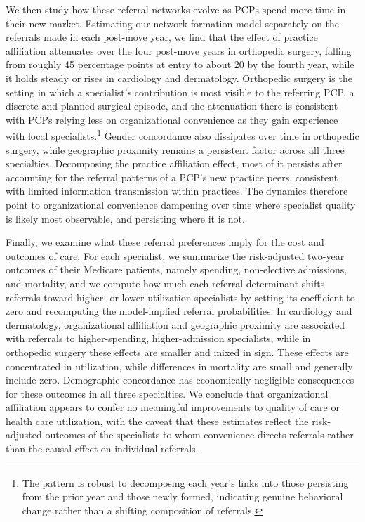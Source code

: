 \documentclass[12pt]{article}
\begin{document}
We then study how these referral networks evolve as PCPs spend more time in their new market. Estimating our network formation model separately on the referrals made in each post-move year, we find that the effect of practice affiliation attenuates over the four post-move years in orthopedic surgery, falling from roughly 45 percentage points at entry to about 20 by the fourth year, while it holds steady or rises in cardiology and dermatology. Orthopedic surgery is the setting in which a specialist's contribution is most visible to the referring PCP, a discrete and planned surgical episode, and the attenuation there is consistent with PCPs relying less on organizational convenience as they gain experience with local specialists.\footnote{The pattern is robust to decomposing each year's links into those persisting from the prior year and those newly formed, indicating genuine behavioral change rather than a shifting composition of referrals.} Gender concordance also dissipates over time in orthopedic surgery, while geographic proximity remains a persistent factor across all three specialties. Decomposing the practice affiliation effect, most of it persists after accounting for the referral patterns of a PCP's new practice peers, consistent with limited information transmission within practices. The dynamics therefore point to organizational convenience dampening over time where specialist quality is likely most observable, and persisting where it is not.

Finally, we examine what these referral preferences imply for the cost and outcomes of care. For each specialist, we summarize the risk-adjusted two-year outcomes of their Medicare patients, namely spending, non-elective admissions, and mortality, and we compute how much each referral determinant shifts referrals toward higher- or lower-utilization specialists by setting its coefficient to zero and recomputing the model-implied referral probabilities. In cardiology and dermatology, organizational affiliation and geographic proximity are associated with referrals to higher-spending, higher-admission specialists, while in orthopedic surgery these effects are smaller and mixed in sign. These effects are concentrated in utilization, while differences in mortality are small and generally include zero. Demographic concordance has economically negligible consequences for these outcomes in all three specialties. We conclude that organizational affiliation appears to confer no meaningful improvements to quality of care or health care utilization, with the caveat that these estimates reflect the risk-adjusted outcomes of the specialists to whom convenience directs referrals rather than the causal effect on individual referrals.
\end{document}
